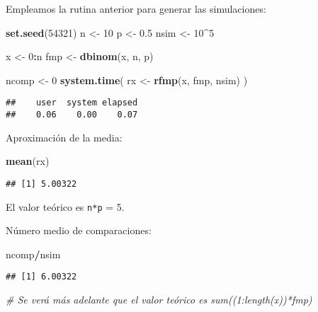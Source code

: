 \documentclass[
]{book}
\newenvironment{Shaded}{\begin{snugshade}}{\end{snugshade}}
\newcommand{\CommentTok}[1]{\textcolor[rgb]{0.56,0.35,0.01}{\textit{#1}}}
\newcommand{\DecValTok}[1]{\textcolor[rgb]{0.00,0.00,0.81}{#1}}
\newcommand{\FloatTok}[1]{\textcolor[rgb]{0.00,0.00,0.81}{#1}}
\newcommand{\KeywordTok}[1]{\textcolor[rgb]{0.13,0.29,0.53}{\textbf{#1}}}
\newcommand{\NormalTok}[1]{#1}
\newcommand{\OperatorTok}[1]{\textcolor[rgb]{0.81,0.36,0.00}{\textbf{#1}}}
\newcommand{\StringTok}[1]{\textcolor[rgb]{0.31,0.60,0.02}{#1}}
\theoremstyle{break}
\theoremstyle{definition}
\theoremstyle{definition}
\theoremstyle{definition}
\theoremstyle{remark}
\begin{document}
Empleamos la rutina anterior para generar las simulaciones:

\begin{Shaded}
\begin{Highlighting}[]
\KeywordTok{set.seed}\NormalTok{(}\DecValTok{54321}\NormalTok{)}
\NormalTok{n <-}\StringTok{ }\DecValTok{10}
\NormalTok{p <-}\StringTok{ }\FloatTok{0.5}
\NormalTok{nsim <-}\StringTok{ }\DecValTok{10}\OperatorTok{^}\DecValTok{5}

\NormalTok{x <-}\StringTok{ }\DecValTok{0}\OperatorTok{:}\NormalTok{n}
\NormalTok{fmp <-}\StringTok{ }\KeywordTok{dbinom}\NormalTok{(x, n, p)}

\NormalTok{ncomp <-}\StringTok{ }\DecValTok{0}
\KeywordTok{system.time}\NormalTok{( rx <-}\StringTok{ }\KeywordTok{rfmp}\NormalTok{(x, fmp, nsim) )}
\end{Highlighting}
\end{Shaded}

\begin{verbatim}
##    user  system elapsed 
##    0.06    0.00    0.07
\end{verbatim}

Aproximación de la media:

\begin{Shaded}
\begin{Highlighting}[]
\KeywordTok{mean}\NormalTok{(rx)}
\end{Highlighting}
\end{Shaded}

\begin{verbatim}
## [1] 5.00322
\end{verbatim}

El valor teórico es \texttt{n*p} = 5.

Número medio de comparaciones:

\begin{Shaded}
\begin{Highlighting}[]
\NormalTok{ncomp}\OperatorTok{/}\NormalTok{nsim}
\end{Highlighting}
\end{Shaded}

\begin{verbatim}
## [1] 6.00322
\end{verbatim}

\begin{Shaded}
\begin{Highlighting}[]
\CommentTok{# Se verá más adelante que el valor teórico es sum((1:length(x))*fmp)}
\end{Highlighting}
\end{Shaded}
\end{document}
